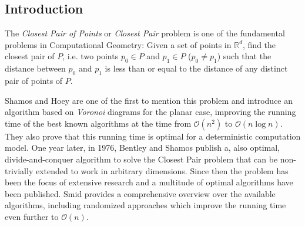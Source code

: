 %
\begin{isabellebody}%
%
%
\isadelimtheory
%
\endisadelimtheory
%
\isatagtheory
%
\endisatagtheory
{\isafoldtheory}%
%
\isadelimtheory
%
\endisadelimtheory
%
\isadelimproof
%
\endisadelimproof
%
\isatagproof
%
\endisatagproof
{\isafoldproof}%
%
\isadelimproof
%
\endisadelimproof
%
\isadelimproof
%
\endisadelimproof
%
\isatagproof
%
\endisatagproof
{\isafoldproof}%
%
\isadelimproof
%
\endisadelimproof
%
\isadelimproof
%
\endisadelimproof
%
\isatagproof
%
\endisatagproof
{\isafoldproof}%
%
\isadelimproof
%
\endisadelimproof
%
\isadelimproof
%
\endisadelimproof
%
\isatagproof
%
\endisatagproof
{\isafoldproof}%
%
\isadelimproof
%
\endisadelimproof
%
\isadelimproof
%
\endisadelimproof
%
\isatagproof
%
\endisatagproof
{\isafoldproof}%
%
\isadelimproof
%
\endisadelimproof
%
\isadelimproof
%
\endisadelimproof
%
\isatagproof
%
\endisatagproof
{\isafoldproof}%
%
\isadelimproof
%
\endisadelimproof
%
\isadelimproof
%
\endisadelimproof
%
\isatagproof
%
\endisatagproof
{\isafoldproof}%
%
\isadelimproof
%
\endisadelimproof
%
\begin{isamarkuptext}%
\section{Introduction}

The \textit{Closest Pair of Points} or \textit{Closest Pair} problem is one of the fundamental
problems in Computational Geometry: Given a set  of  points in $\mathbb{R}^d$,
find the closest pair of $P$, i.e. two points $p_0 \in P$ and $p_1 \in P$ ($p_0 \ne p_1$) such that
the distance between $p_0$ and $p_1$ is less than or equal to the distance of any distinct pair
of points of $P$.

Shamos and Hoey \cite{Closest-Point-Problems:1975} are one of the first to mention this problem and
introduce an algorithm based on \textit{Voronoi} diagrams for the planar case, improving the running
time of the best known algorithms at the time from $\mathcal{O}(n^2)$ to
$\mathcal{O}(n \log n)$. They also prove that this running time is optimal for a
deterministic computation model. One year later, in 1976, Bentley and Shamos
\cite{Divide-And-Conquer-In-Multidimensional-Space:1976} publish a, also optimal, divide-and-conquer
algorithm to solve the Closest Pair problem that can be non-trivially extended to work in arbitrary dimensions. Since then the problem has been the focus of extensive research and
a multitude of optimal algorithms have been published. Smid \cite{Handbook-Computational-Geometry:2000}
provides a comprehensive overview over the available algorithms, including randomized approaches which
improve the running time even further to $\mathcal{O}(n)$.


\end{isamarkuptext}
\end{isabellebody}
